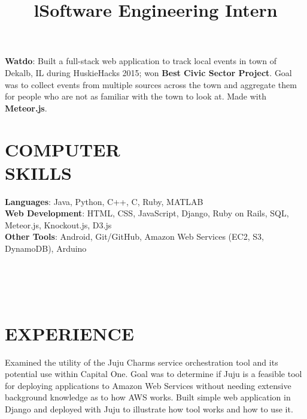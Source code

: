 \documentclass[margin]{res}
\begin{document}
\begin{resume}
\par
\textbf{Watdo}:
Built a full-stack web application to track local events in town of Dekalb, IL during
HuskieHacks 2015; won \textbf{Best Civic Sector Project}. Goal was to collect events
from multiple sources across the town and aggregate them for people who are not as familiar
with the town to look at. Made with \textbf{Meteor.js}.


\section{COMPUTER\\SKILLS}

\textbf{Languages}: Java, Python, C++, C, Ruby, MATLAB
\\
\textbf{Web Development}: HTML, CSS, JavaScript, Django, Ruby on Rails, SQL,
                          Meteor.js, Knockout.js, D3.js
\\
\textbf{Other Tools}: Android, Git/GitHub, Amazon Web Services (EC2, S3, DynamoDB), Arduino

\begin{format}
\title{l}\\
\\
\body\\
\end{format}

\section{EXPERIENCE}
\title{\textbf{Software Engineering Intern}}
\begin{position}
Examined the utility of the Juju Charms service orchestration tool and its potential
use within Capital One. Goal was to determine if Juju is a feasible tool for deploying
applications to Amazon Web Services without needing extensive background knowledge as
to how AWS works. Built simple web application in Django and deployed with Juju to
illustrate how tool works and how to use it.
\end{position}


\end{resume}
\end{document}
